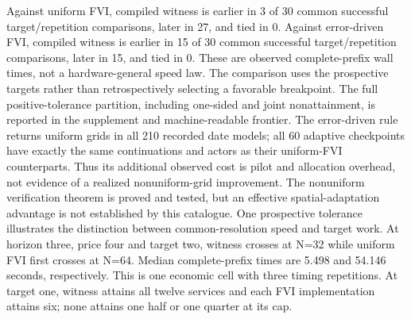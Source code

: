 Against uniform FVI, compiled witness is earlier in 3 of 30 common successful target/repetition comparisons, later in 27, and tied in 0.
Against error-driven FVI, compiled witness is earlier in 15 of 30 common successful target/repetition comparisons, later in 15, and tied in 0.
These are observed complete-prefix wall times, not a hardware-general speed law. The comparison uses the prospective targets rather than retrospectively selecting a favorable breakpoint. The full positive-tolerance partition, including one-sided and joint nonattainment, is reported in the supplement and machine-readable frontier.
The error-driven rule returns uniform grids in all 210 recorded date models; all 60 adaptive checkpoints have exactly the same continuations and actors as their uniform-FVI counterparts. Thus its additional observed cost is pilot and allocation overhead, not evidence of a realized nonuniform-grid improvement. The nonuniform verification theorem is proved and tested, but an effective spatial-adaptation advantage is not established by this catalogue.
One prospective tolerance illustrates the distinction between common-resolution speed and target work. At horizon three, price four and target two, witness crosses at N=32 while uniform FVI first crosses at N=64. Median complete-prefix times are 5.498 and 54.146 seconds, respectively. This is one economic cell with three timing repetitions. At target one, witness attains all twelve services and each FVI implementation attains six; none attains one half or one quarter at its cap.
